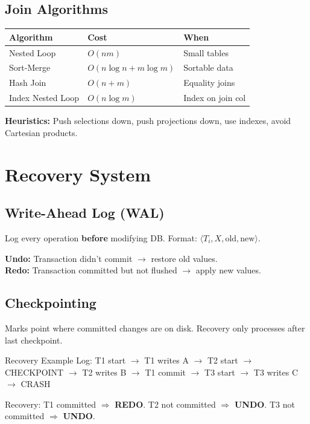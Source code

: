 \documentclass[12pt,a4paper]{article}
\begin{document}
\subsection{Join Algorithms}
\begin{center}
\begin{tabular}{@{}l l l@{}}
\toprule
\textbf{Algorithm} & \textbf{Cost} & \textbf{When} \\
\midrule
Nested Loop & $O(nm)$ & Small tables \\
Sort-Merge & $O(n\log n + m\log m)$ & Sortable data \\
Hash Join & $O(n+m)$ & Equality joins \\
Index Nested Loop & $O(n\log m)$ & Index on join col \\
\bottomrule
\end{tabular}
\end{center}

\textbf{Heuristics:} Push selections down, push projections down, use indexes, avoid Cartesian products.

\section{Recovery System}

\subsection{Write-Ahead Log (WAL)}
Log every operation \textbf{before} modifying DB. Format: $\langle T_i, X, \text{old}, \text{new} \rangle$.

\textbf{Undo:} Transaction didn't commit $\to$ restore old values.\\
\textbf{Redo:} Transaction committed but not flushed $\to$ apply new values.

\subsection{Checkpointing}
Marks point where committed changes are on disk. Recovery only processes after last checkpoint.

\begin{examplebox}{Recovery Example}
Log: T1 start $\to$ T1 writes A $\to$ T2 start $\to$ CHECKPOINT $\to$ T2 writes B $\to$ T1 commit $\to$ T3 start $\to$ T3 writes C $\to$ CRASH

Recovery: T1 committed $\Rightarrow$ \textbf{REDO}. T2 not committed $\Rightarrow$ \textbf{UNDO}. T3 not committed $\Rightarrow$ \textbf{UNDO}.
\end{examplebox}
\end{document}
